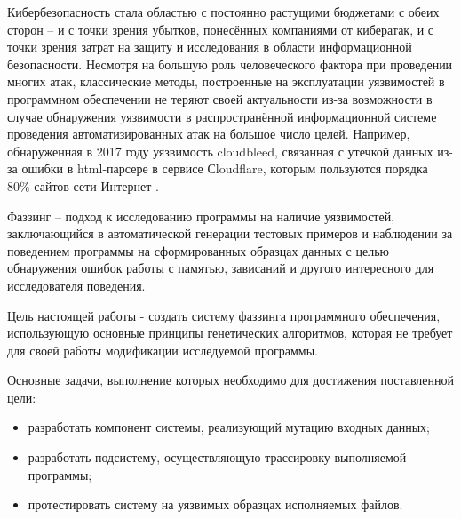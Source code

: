 \label{sec:intro}


Кибербезопасность стала областью с постоянно растущими бюджетами с обеих сторон -- и с точки зрения убытков, понесённых компаниями от кибератак, и с точки зрения затрат на защиту и исследования в области информационной безопасности. Несмотря на большую роль человеческого фактора при проведении многих атак, классические методы, построенные на эксплуатации уязвимостей в программном обеспечении не теряют своей актуальности из-за возможности в случае обнаружения уязвимости в распространённой информационной системе проведения автоматизированных атак на большое число целей. Например, обнаруженная в 2017 году уязвимость cloudbleed, связанная с утечкой данных из-за ошибки в html-парсере в сервисе Сloudflare, которым пользуются порядка 80\% сайтов сети Интернет \cite{cloudbleed}.




Фаззинг -- подход к исследованию программы на наличие уязвимостей, заключающийся в автоматической генерации тестовых примеров и наблюдении за поведением программы на сформированных образцах данных с целью обнаружения ошибок работы с памятью, зависаний и другого интересного для исследователя поведения.

Цель настоящей работы - создать систему фаззинга программного обеспечения, использующую основные принципы генетических алгоритмов, которая не требует для своей работы модификации исследуемой программы.

Основные задачи, выполнение которых необходимо для достижения поставленной цели:

\begin{itemize}
	\item разработать компонент системы, реализующий мутацию входных данных;
	
	\item разработать подсистему, осуществляющую трассировку выполняемой программы;
	
	\item протестировать систему на уязвимых образцах исполняемых файлов.
\end{itemize}